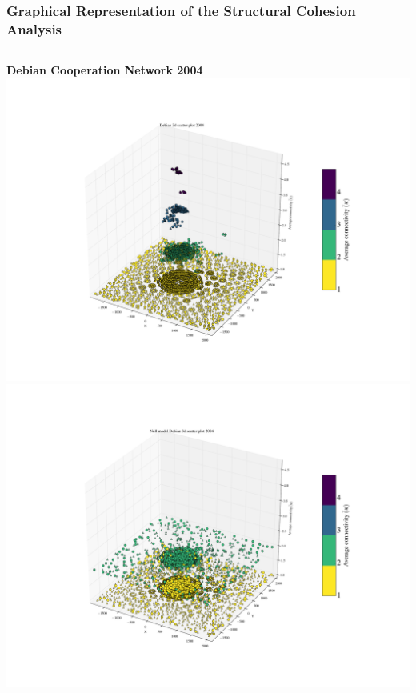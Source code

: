 \documentclass[ignorenonframetext,red,8pt,notes=hide]{beamer}
\begin{document}
\begin{frame}
\frametitle{Graphical Representation of the Structural Cohesion Analysis}

\begin{columns}[c]
\begin{column}{0.5\textwidth}
\begin{center}
\textbf{Debian Cooperation Network 2004}
\includegraphics[scale=0.12]{../../figures/3d_scatter_debian_2004}
\newline
\includegraphics[scale=0.12]{../../figures/3d_scatter_debian_2004_null}
\end{center}
\end{column}


\end{columns}
\end{frame}
\end{document}
